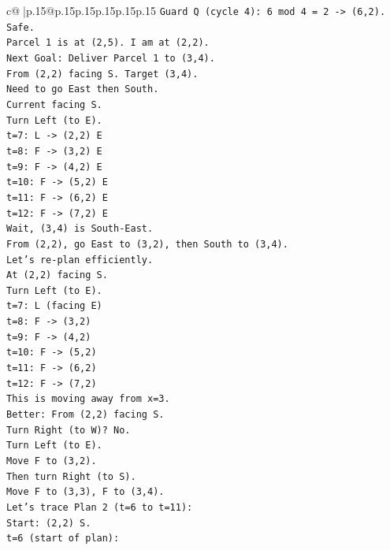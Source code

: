 \documentclass{article}
\begin{document}
{\begin{supertabular}{c@{$\;$}|p{.15\linewidth}@{}p{.15\linewidth}p{.15\linewidth}p{.15\linewidth}p{.15\linewidth}p{.15\linewidth}}
{{{\texttt{Guard Q (cycle 4): 6 mod 4 = 2 {-}> (6,2). Safe.} \\
\texttt{Parcel 1 is at (2,5). I am at (2,2).} \\
\texttt{Next Goal: Deliver Parcel 1 to (3,4).} \\
\texttt{From (2,2) facing S. Target (3,4).} \\
\texttt{Need to go East then South.} \\
\texttt{Current facing S.} \\
\texttt{Turn Left (to E).} \\
\texttt{t=7: L {-}> (2,2) E} \\
\texttt{t=8: F {-}> (3,2) E} \\
\texttt{t=9: F {-}> (4,2) E} \\
\texttt{t=10: F {-}> (5,2) E} \\
\texttt{t=11: F {-}> (6,2) E} \\
\texttt{t=12: F {-}> (7,2) E} \\
\texttt{Wait, (3,4) is South{-}East.} \\
\texttt{From (2,2), go East to (3,2), then South to (3,4).} \\
\texttt{Let's re{-}plan efficiently.} \\
\texttt{At (2,2) facing S.} \\
\texttt{Turn Left (to E).} \\
\texttt{t=7: L (facing E)} \\
\texttt{t=8: F {-}> (3,2)} \\
\texttt{t=9: F {-}> (4,2)} \\
\texttt{t=10: F {-}> (5,2)} \\
\texttt{t=11: F {-}> (6,2)} \\
\texttt{t=12: F {-}> (7,2)} \\
\texttt{This is moving away from x=3.} \\
\texttt{Better: From (2,2) facing S.} \\
\texttt{Turn Right (to W)? No.} \\
\texttt{Turn Left (to E).} \\
\texttt{Move F to (3,2).} \\
\texttt{Then turn Right (to S).} \\
\texttt{Move F to (3,3), F to (3,4).} \\
\texttt{Let's trace Plan 2 (t=6 to t=11):} \\
\texttt{Start: (2,2) S.} \\
\texttt{t=6 (start of plan):} \\
}}}
\end{supertabular}}
\end{document}
